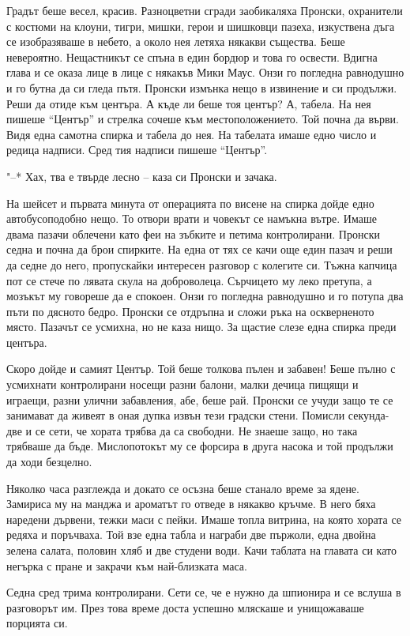 \documentclass[ebook,openany,12pt]{memoir}
\begin{document}
Градът беше весел, красив. Разноцветни сгради заобикаляха Пронски, охранители с костюми на клоуни, тигри, мишки, герои и шишковци пазеха, изкуствена дъга се изобразяваше в небето, а около нея летяха някакви същества. Беше невероятно. Нещастникът се спъна в един бордюр и това го освести. Вдигна глава и се оказа лице в лице с някакъв Мики Маус. Онзи го погледна равнодушно и го бутна да си гледа пътя. Пронски измънка нещо в извинение и си продължи. Реши да отиде към центъра. А къде ли беше тоя център? А, табела. На нея пишеше ``Център'' и стрелка сочеше към местоположението. Той почна да върви. Видя една самотна спирка и табела до нея. На табелата имаше едно число и редица надписи. Сред тия надписи пишеше ``Център''.

"--* Хах, тва е твърде лесно – каза си Пронски и зачака.

На шейсет и първата минута от операцията по висене на спирка дойде едно автобусоподобно нещо. То отвори врати и човекът се намъкна вътре. Имаше двама пазачи облечени като феи на зъбките и петима контролирани. Пронски седна и почна да брои спирките. На една от тях се качи още един пазач и реши да седне до него, пропускайки интересен разговор с колегите си. Тъжна капчица пот се стече по лявата скула на доброволеца. Сърчицето му леко претупа, а мозъкът му говореше да е спокоен. Онзи го погледна равнодушно и го потупа два пъти по дясното бедро. Пронски се отдръпна и сложи ръка на оскверненото място. Пазачът се усмихна, но не каза нищо. За щастие слезе една спирка преди центъра.

Скоро дойде и самият Център. Той беше толкова пълен и забавен! Беше пълно с усмихнати контролирани носещи разни балони, малки дечица пищящи и играещи, разни улични забавления, абе, беше рай. Пронски се учуди защо те се занимават да живеят в оная дупка извън тези градски стени. Помисли секунда-две и се сети, че хората трябва да са свободни. Не знаеше защо, но така трябваше да бъде. Мислопотокът му се форсира в друга насока и той продължи да ходи безцелно. 

Няколко часа разглежда и докато се осъзна беше станало време за ядене. Замириса му на манджа и ароматът го отведе в някакво кръчме. В него бяха наредени дървени, тежки маси с пейки. Имаше топла витрина, на която хората се редяха и поръчваха. Той взе една табла и награби две пържоли, една двойна зелена салата, половин хляб и две студени води. Качи таблата на главата си като негърка с пране и закрачи към най-близката маса.

Седна сред трима контролирани. Сети се, че е нужно да шпионира и се вслуша в разговорът им. През това време доста успешно мляскаше и унищожаваше порцията си.
\end{document}
